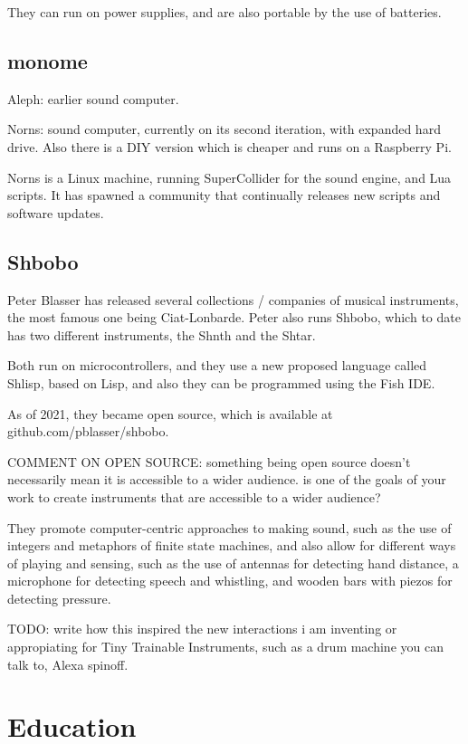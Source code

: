 They can run on power supplies, and are also portable by the use of batteries.

\subsection{monome}

Aleph: earlier sound computer.

Norns: sound computer, currently on its second iteration, with expanded hard drive. Also there is a DIY version which is cheaper and runs on a Raspberry Pi.

Norns is a Linux machine, running SuperCollider for the sound engine, and Lua scripts. It has spawned a community that continually releases new scripts and software updates.

\subsection{Shbobo}

Peter Blasser has released several collections / companies of musical instruments, the most famous one being Ciat-Lonbarde. Peter also runs Shbobo, which to date has two different instruments, the Shnth and the Shtar.

Both run on microcontrollers, and they use a new proposed language called Shlisp, based on Lisp, and also they can be programmed using the Fish IDE.

As of 2021, they became open source, which is available at github.com/pblasser/shbobo.

COMMENT ON OPEN SOURCE: something being open source doesn't necessarily mean it is accessible to a wider audience. is one of the goals of your work to create instruments that are accessible to a wider audience?

They promote computer-centric approaches to making sound, such as the use of integers and metaphors of finite state machines, and also allow for different ways of playing and sensing, such as the use of antennas for detecting hand distance, a microphone for detecting speech and whistling, and wooden bars with piezos for detecting pressure.

TODO: write how this inspired the new interactions i am inventing or appropiating for Tiny Trainable Instruments, such as a drum machine you can talk to, Alexa spinoff.

\section{Education}

